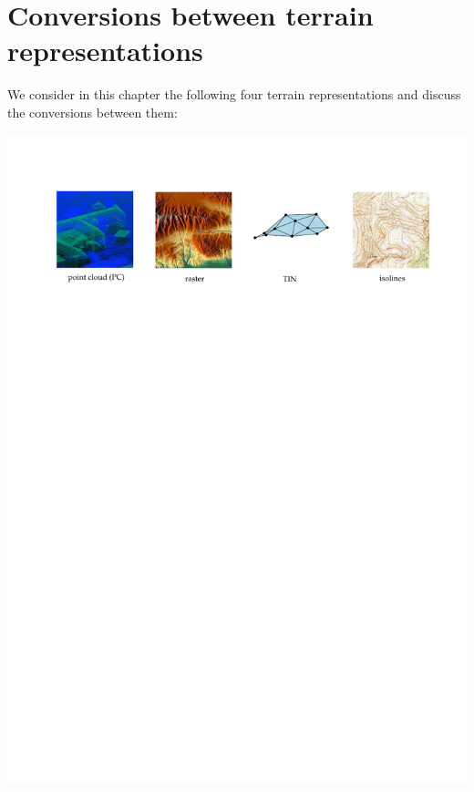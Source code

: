 
\graphicspath{{conversion/}}

\chapter{Conversions between terrain representations}
\label{chap:conversion}

We consider in this chapter the following four terrain representations and discuss the conversions between them:
\vspace{5mm}

\includegraphics[width=\linewidth]{figs/reps}
\vspace{10mm}

